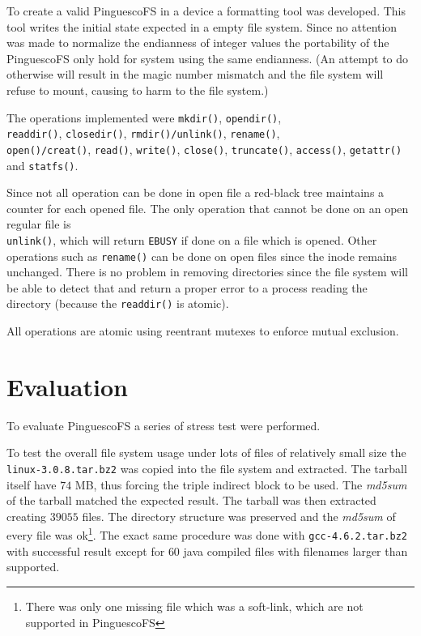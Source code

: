 \documentclass{acm_proc_article-sp}
\newcommand{\pfsfs}{PinguescoFS\xspace}
\begin{document}
To create a valid \pfsfs in a device a formatting tool was developed.
This tool writes the initial state expected in a empty file system.
Since no attention was made to normalize the endianness of integer
values the portability of the \pfsfs only hold for system using
the same endianness. (An attempt to do otherwise will result in the
magic number mismatch and the file system will refuse to mount, causing
to harm to the file system.)

The operations implemented were \verb|mkdir()|, \verb|opendir()|, \\
\verb|readdir()|, \verb|closedir()|, \verb|rmdir()/unlink()|,
\verb|rename()|, \\ \verb|open()/creat()|, \verb|read()|, \verb|write()|,
\verb|close()|, \verb|truncate()|, \verb|access()|, \verb|getattr()| and
\verb|statfs()|.

Since not all operation can be done in open file a red-black tree maintains
a counter for each opened file. The only operation that cannot be done
on an open regular file is \\ \verb|unlink()|, which will return \verb|EBUSY|
if done on a file which is opened. Other operations such as \verb|rename()|
can be done on open files since the inode remains unchanged. There is
no problem in removing directories since the file system will be able to
detect that and return a proper error to a process reading the directory 
(because the \verb|readdir()| is atomic).

All operations are atomic using reentrant mutexes to enforce mutual exclusion.

\section{Evaluation}
To evaluate \pfsfs a series of stress test were performed.

To test the overall file system usage under lots of files of relatively
small size the \verb|linux-3.0.8.tar.bz2| was copied into the file system
and extracted. The tarball itself have $74$ MB, thus forcing the
triple indirect block to be used. The \emph{md5sum} of the tarball 
matched the expected result. The tarball was then extracted
creating $39055$ files. The directory structure was preserved and 
the \emph{md5sum} of every file was ok\footnote{There was only one missing file
which was a soft-link, which are not supported in \pfsfs}.
The exact same procedure was done with \verb|gcc-4.6.2.tar.bz2| with
successful result except for $60$ java compiled files with filenames
larger than supported.
\end{document}
